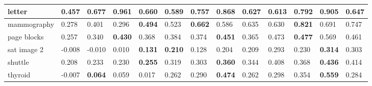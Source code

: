 \begin{table}[]
{\begin{tabular}{|l|llll|llllllll|}
letter            & \multicolumn{1}{l|}{0.457}          & \multicolumn{1}{l|}{0.677}          & \multicolumn{1}{l|}{\textbf{0.961}} & 0.660          & \multicolumn{1}{l|}{0.589}          & \multicolumn{1}{l|}{0.757}          & \multicolumn{1}{l|}{\textbf{0.868}} & \multicolumn{1}{l|}{0.627}          & \multicolumn{1}{l|}{0.613}  & \multicolumn{1}{l|}{0.792}          & \multicolumn{1}{l|}{\textbf{0.905}} & 0.647          \\ \hline
mammography       & \multicolumn{1}{l|}{0.278}          & \multicolumn{1}{l|}{0.401}          & \multicolumn{1}{l|}{0.296}          & \textbf{0.494} & \multicolumn{1}{l|}{0.523}          & \multicolumn{1}{l|}{\textbf{0.662}} & \multicolumn{1}{l|}{0.586}          & \multicolumn{1}{l|}{0.635}          & \multicolumn{1}{l|}{0.630}  & \multicolumn{1}{l|}{\textbf{0.821}} & \multicolumn{1}{l|}{0.691}          & 0.747          \\ \hline
page blocks       & \multicolumn{1}{l|}{0.257}          & \multicolumn{1}{l|}{0.340}          & \multicolumn{1}{l|}{\textbf{0.430}} & 0.368          & \multicolumn{1}{l|}{0.384}          & \multicolumn{1}{l|}{0.374}          & \multicolumn{1}{l|}{\textbf{0.451}} & \multicolumn{1}{l|}{0.365}          & \multicolumn{1}{l|}{0.473}  & \multicolumn{1}{l|}{\textbf{0.477}} & \multicolumn{1}{l|}{0.569}          & 0.461          \\ \hline
sat image 2       & \multicolumn{1}{l|}{-0.008}         & \multicolumn{1}{l|}{-0.010}         & \multicolumn{1}{l|}{0.010}          & \textbf{0.131} & \multicolumn{1}{l|}{\textbf{0.210}} & \multicolumn{1}{l|}{0.128}          & \multicolumn{1}{l|}{0.204}          & \multicolumn{1}{l|}{0.209}          & \multicolumn{1}{l|}{0.293}  & \multicolumn{1}{l|}{0.230}          & \multicolumn{1}{l|}{\textbf{0.314}} & 0.303          \\ \hline
shuttle           & \multicolumn{1}{l|}{0.208}          & \multicolumn{1}{l|}{0.233}          & \multicolumn{1}{l|}{0.230}          & \textbf{0.255} & \multicolumn{1}{l|}{0.319}          & \multicolumn{1}{l|}{0.303}          & \multicolumn{1}{l|}{\textbf{0.360}} & \multicolumn{1}{l|}{0.344}          & \multicolumn{1}{l|}{0.408}  & \multicolumn{1}{l|}{0.368}          & \multicolumn{1}{l|}{\textbf{0.436}} & 0.414          \\ \hline
thyroid           & \multicolumn{1}{l|}{-0.007}         & \multicolumn{1}{l|}{\textbf{0.064}} & \multicolumn{1}{l|}{0.059}          & 0.017          & \multicolumn{1}{l|}{0.262}          & \multicolumn{1}{l|}{0.290}          & \multicolumn{1}{l|}{\textbf{0.474}} & \multicolumn{1}{l|}{0.262}          & \multicolumn{1}{l|}{0.298}  & \multicolumn{1}{l|}{0.354}          & \multicolumn{1}{l|}{\textbf{0.559}} & 0.284          \\ \hline

\end{tabular}}
\end{table}
